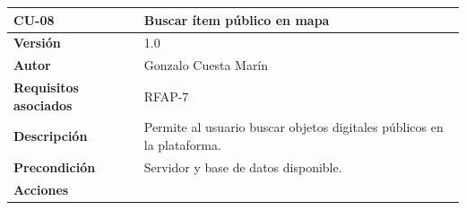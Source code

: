 \documentclass[
]{article}
\begin{document}
\begin{longtable}[]{@{}ll@{}}
\toprule
\begin{minipage}[b]{0.20\columnwidth}\raggedright
\textbf{CU-08}\strut
\end{minipage} & \begin{minipage}[b]{0.74\columnwidth}\raggedright
\textbf{Buscar ítem público en mapa}\strut
\end{minipage}\tabularnewline
\midrule
\endhead
\begin{minipage}[t]{0.20\columnwidth}\raggedright
\textbf{Versión}\strut
\end{minipage} & \begin{minipage}[t]{0.74\columnwidth}\raggedright
1.0\strut
\end{minipage}\tabularnewline
\begin{minipage}[t]{0.20\columnwidth}\raggedright
\textbf{Autor}\strut
\end{minipage} & \begin{minipage}[t]{0.74\columnwidth}\raggedright
Gonzalo Cuesta Marín\strut
\end{minipage}\tabularnewline
\begin{minipage}[t]{0.20\columnwidth}\raggedright
\textbf{Requisitos asociados}\strut
\end{minipage} & \begin{minipage}[t]{0.74\columnwidth}\raggedright
RFAP-7\strut
\end{minipage}\tabularnewline
\begin{minipage}[t]{0.20\columnwidth}\raggedright
\textbf{Descripción}\strut
\end{minipage} & \begin{minipage}[t]{0.74\columnwidth}\raggedright
Permite al usuario buscar objetos digitales públicos en la
plataforma.\strut
\end{minipage}\tabularnewline
\begin{minipage}[t]{0.20\columnwidth}\raggedright
\textbf{Precondición}\strut
\end{minipage} & \begin{minipage}[t]{0.74\columnwidth}\raggedright
Servidor y base de datos disponible.\strut
\end{minipage}\tabularnewline
\begin{minipage}[t]{0.20\columnwidth}\raggedright
\textbf{Acciones}\strut
\end{minipage} & \begin{minipage}[t]{0.74\columnwidth}\raggedright
\begin{enumerate}

\end{enumerate}
\end{minipage}
\end{longtable}
\end{document}

